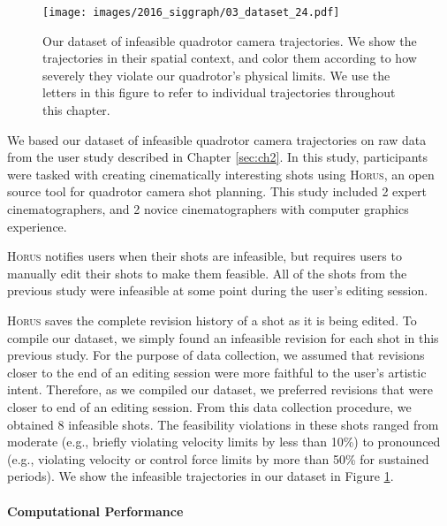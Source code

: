 \begin{figure}[th!]
\centering
\texttt{[image: images/2016\_siggraph/03\_dataset\_24.pdf]}
\caption{
Our dataset of infeasible quadrotor camera trajectories.
We show the trajectories in their spatial context, and color them according to how severely they violate our quadrotor's physical limits.
We use the letters in this figure to refer to individual trajectories throughout this chapter.
}
\label{fig:ch3:dataset}
\end{figure}

We based our dataset of infeasible quadrotor camera trajectories on raw data from the user study described in Chapter \ref{sec:ch2}.
In this study, participants were tasked with creating cinematically interesting shots using \textsc{Horus}, an open source tool for quadrotor camera shot planning.
This study included 2 expert cinematographers, and 2 novice cinematographers with computer graphics experience.

\textsc{Horus} notifies users when their shots are infeasible, but requires users to manually edit their shots to make them feasible.
All of the shots from the previous study were infeasible at some point during the user's editing session.

\textsc{Horus} saves the complete revision history of a shot as it is being edited.
To compile our dataset, we simply found an infeasible revision for each shot in this previous study.
For the purpose of data collection, we assumed that revisions closer to the end of an editing session were more faithful to the user's artistic intent.
Therefore, as we compiled our dataset, we preferred revisions that were closer to end of an editing session. 
From this data collection procedure, we obtained 8 infeasible shots.
The feasibility violations in these shots ranged from moderate (e.g., briefly violating velocity limits by less than 10\%) to pronounced (e.g., violating velocity or control force limits by more than 50\% for sustained periods). 
We show the infeasible trajectories in our dataset in Figure \ref{fig:ch3:dataset}.

\paragraph{Computational Performance}

